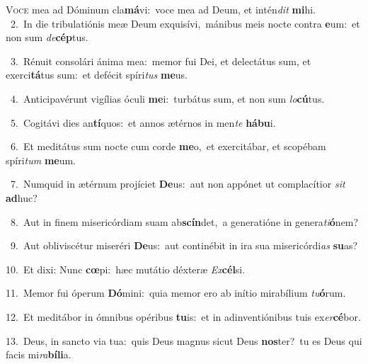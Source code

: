 \lettrine{\initial\textcolor{\initialcolor}{V}}{oce} mea ad Dóminum cla\-\textbf{má}\-vi:~\star voce mea ad Deum, et intén\textit{dit} \textbf{mi}\-hi.\\
{\numbfont\textcolor{\numbcolor}{~2.}}~In die tribulatiónis meæ Deum exquisívi,~\dagger mánibus meis nocte contra \textbf{e}\-um:~\star et non sum \textit{de}\-\textbf{cép}tus.\par
{\numbfont\textcolor{\numbcolor}{~3.}}~Rénuit consolári ánima mea:~\dagger memor fui Dei, et delectátus sum, et exerci\-\textbf{tá}\-tus sum:~\star et defécit spíri\textit{tus} \textbf{me}\-us.\par
{\numbfont\textcolor{\numbcolor}{~4.}}~Anticipavérunt vigílias óculi \textbf{me}\-i:~\star turbátus sum, et non sum \textit{lo}\-\textbf{cú}tus.\par
{\numbfont\textcolor{\numbcolor}{~5.}}~Cogitávi dies an\-\textbf{tí}\-quos:~\star et annos ætérnos in men\textit{te} \textbf{há}\-\textbf{bu}i.\par
{\numbfont\textcolor{\numbcolor}{~6.}}~Et meditátus sum nocte cum corde \textbf{me}\-o,~\star et exercitábar, et scopébam spíri\textit{tum} \textbf{me}\-um.\par
{\numbfont\textcolor{\numbcolor}{~7.}}~Numquid in ætérnum projíciet \textbf{De}\-us:~\star aut non appónet ut complacítior \textit{sit} \textbf{ad}\-huc?\par
{\numbfont\textcolor{\numbcolor}{~8.}}~Aut in finem misericórdiam suam ab\-\textbf{scín}\-det,~\star a generatióne in genera\-\textit{ti}\-\textbf{ó}nem?\par
{\numbfont\textcolor{\numbcolor}{~9.}}~Aut obliviscétur miseréri \textbf{De}\-us:~\star aut continébit in ira sua misericórdi\textit{as} \textbf{su}\-as?\par
{\numbfont\textcolor{\numbcolor}{10.}}~Et dixi: Nunc \textbf{cœ}\-pi:~\star hæc mutátio déxteræ \textit{Ex}\-\textbf{cél}si.\par
{\numbfont\textcolor{\numbcolor}{11.}}~Memor fui óperum \textbf{Dó}\-mini:~\star quia memor ero ab inítio mirabílium \textit{tu}\-\textbf{ó}rum.\par
{\numbfont\textcolor{\numbcolor}{12.}}~Et meditábor in ómnibus opéribus \textbf{tu}\-is:~\star et in adinventiónibus tuis ex\-\textit{er}\-\textbf{cé}bor.\par
{\numbfont\textcolor{\numbcolor}{13.}}~Deus, in sancto via tua:~\dagger quis Deus magnus sicut Deus \textbf{nos}\-ter?~\star tu es Deus qui facis mi\-\textit{ra}\-\textbf{bí}\textbf{li}a.\par
